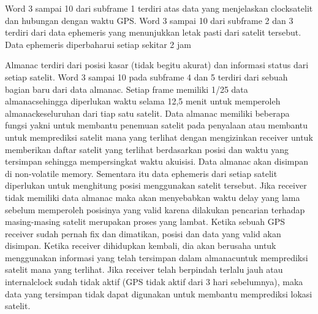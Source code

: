 Word 3 sampai 10 dari subframe 1 terdiri atas data yang menjelaskan clocksatelit dan hubungan dengan waktu GPS. Word 3 sampai 10 dari subframe 2 dan 3 terdiri dari data ephemeris yang menunjukkan letak pasti dari satelit tersebut. Data ephemeris diperbaharui setiap sekitar 2 jam

Almanac terdiri dari posisi kasar (tidak begitu akurat) dan informasi status dari setiap satelit. Word 3 sampai 10 pada subframe 4 dan 5 terdiri dari sebuah bagian baru dari data almanac. Setiap frame memiliki 1/25 data almanacsehingga diperlukan waktu selama 12,5 menit untuk memperoleh almanackeseluruhan dari tiap satu satelit. Data almanac memiliki beberapa fungsi yakni untuk membantu penemuan satelit pada penyalaan atau membantu untuk memprediksi satelit mana yang terlihat dengan mengizinkan receiver untuk memberikan daftar satelit yang terlihat berdasarkan posisi dan waktu yang tersimpan sehingga mempersingkat waktu akuisisi. Data almanac akan disimpan di non-volatile memory. Sementara itu data ephemeris dari setiap satelit diperlukan untuk menghitung posisi menggunakan satelit tersebut. Jika receiver tidak memiliki data almanac maka akan menyebabkan waktu delay yang lama sebelum memperoleh posisinya yang valid karena dilakukan pencarian terhadap masing-masing satelit merupakan proses yang lambat. Ketika sebuah GPS receiver sudah pernah fix dan dimatikan, posisi dan data yang valid akan disimpan. Ketika receiver dihidupkan kembali, dia akan berusaha untuk menggunakan informasi yang telah tersimpan dalam almanacuntuk memprediksi satelit mana yang terlihat. Jika receiver telah berpindah terlalu jauh atau internalclock sudah tidak aktif (GPS tidak aktif dari 3 hari sebelumnya), maka data yang tersimpan tidak dapat digunakan untuk membantu memprediksi lokasi satelit.


